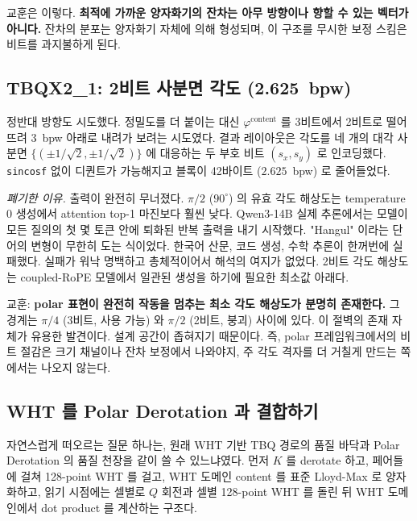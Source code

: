 \documentclass[10pt,twocolumn]{article}
\begin{document}
교훈은 이렇다. \textbf{최적에 가까운 양자화기의 잔차는 아무 방향이나 향할 수 있는 벡터가 아니다.} 잔차의 분포는 양자화기 자체에 의해 형성되며, 이 구조를 무시한 보정 스킴은 비트를 과지불하게 된다.

\subsection{TBQX2\_1: 2비트 사분면 각도 (2.625~bpw)}

정반대 방향도 시도했다. 정밀도를 더 붙이는 대신 $\varphi^{\text{content}}$ 를 3비트에서 2비트로 떨어뜨려 3~bpw 아래로 내려가 보려는 시도였다. 결과 레이아웃은 각도를 네 개의 대각 사분면 $\{(\pm 1/\sqrt{2},\pm 1/\sqrt{2})\}$ 에 대응하는 두 부호 비트 $(s_x, s_y)$ 로 인코딩했다. \texttt{sincosf} 없이 디퀀트가 가능해지고 블록이 42바이트 ($2.625$~bpw) 로 줄어들었다.

\emph{폐기한 이유.} 출력이 완전히 무너졌다. $\pi/2$ ($90^\circ$) 의 유효 각도 해상도는 temperature $0$ 생성에서 attention top-1 마진보다 훨씬 낮다. Qwen3-14B 실제 추론에서는 모델이 모든 질의의 첫 몇 토큰 안에 퇴화된 반복 출력을 내기 시작했다. "Hangul" 이라는 단어의 변형이 무한히 도는 식이었다. 한국어 산문, 코드 생성, 수학 추론이 한꺼번에 실패했다. 실패가 워낙 명백하고 총체적이어서 해석의 여지가 없었다. 2비트 각도 해상도는 coupled-RoPE 모델에서 일관된 생성을 하기에 필요한 최소값 아래다.

교훈: \textbf{polar 표현이 완전히 작동을 멈추는 최소 각도 해상도가 분명히 존재한다.} 그 경계는 $\pi/4$ (3비트, 사용 가능) 와 $\pi/2$ (2비트, 붕괴) 사이에 있다. 이 절벽의 존재 자체가 유용한 발견이다. 설계 공간이 좁혀지기 때문이다. 즉, polar 프레임워크에서의 비트 절감은 크기 채널이나 잔차 보정에서 나와야지, 주 각도 격자를 더 거칠게 만드는 쪽에서는 나오지 않는다.

\subsection{WHT 를 Polar Derotation 과 결합하기}

자연스럽게 떠오르는 질문 하나는, 원래 WHT 기반 TBQ 경로의 품질 바닥과 Polar Derotation 의 품질 천장을 같이 쓸 수 있느냐였다. 먼저 $K$ 를 derotate 하고, 페어들에 걸쳐 128-point WHT 를 걸고, WHT 도메인 content 를 표준 Lloyd-Max 로 양자화하고, 읽기 시점에는 셀별로 $Q$ 회전과 셀별 128-point WHT 를 돌린 뒤 WHT 도메인에서 dot product 를 계산하는 구조다.
\end{document}

